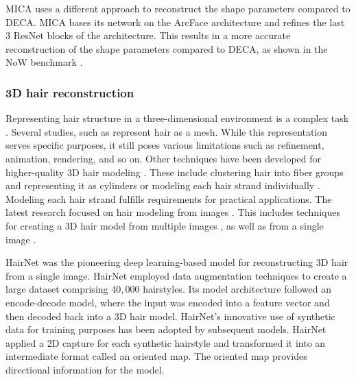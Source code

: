 MICA uses a different approach to reconstruct the shape parameters compared to DECA. MICA bases its network on the ArcFace architecture \cite{dengSubcenterArcFaceBoosting2020} and refines the last 3 ResNet blocks of the architecture. This results in a more accurate reconstruction of the shape parameters compared to DECA, as shown in the NoW benchmark \cite{RingNet:CVPR:2019}.


\subsubsection{3D hair reconstruction}
Representing hair structure in a three-dimensional environment is a complex task \cite{wardSurveyHairModeling2007}. Several studies, such as \cite{dengRetinaFaceSinglestageDense2019,papadopoulosFaceGCNGraphConvolutional2021,saitoPIFuPixelAlignedImplicit2019,zeng3DHumanMesh2020} represent hair as a mesh. While this representation serves specific purposes, it still poses various limitations such as refinement, animation, rendering, and so on.
Other techniques have been developed for higher-quality 3D hair modeling \cite{wardSurveyHairModeling2007}. These include clustering hair into fiber groups and representing it as cylinders \cite{yangClusterHairModel2000} or modeling each hair strand individually \cite{wardSurveyHairModeling2007}. Modeling each hair strand fulfills requirements for practical applications.
The latest research focused on hair modeling from images \cite{baoSurveyImageBasedTechniques2018}. This includes techniques for creating a 3D hair model from multiple images \cite{zhangDatadrivenApproachFourview2017}, as well as from a single image \cite{chaiDynamicHairManipulation2013,chaiSingleviewHairModeling2012,huSingleviewHairModeling2015}.



HairNet \cite{zhouHairNetSingleViewHair2018} was the pioneering deep learning-based model for reconstructing 3D hair from a single image. HairNet employed data augmentation techniques to create a large dataset comprising $40,000$ hairstyles. Its model architecture followed an encode-decode model, where the input was encoded into a feature vector and then decoded back into a 3D hair model. HairNet's innovative use of synthetic data for training purposes has been adopted by subsequent models. HairNet applied a 2D capture for each synthetic hairstyle and transformed it into an intermediate format called an oriented map. The oriented map provides directional information for the model.

